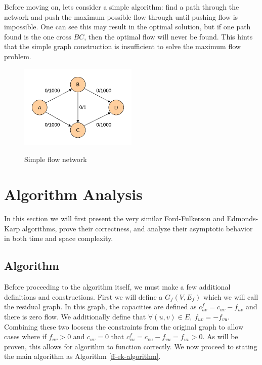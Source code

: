 \documentclass{article}
\begin{document}
Before moving on, lets consider a simple algorithm: find a path through the network and push the maximum possible flow through until pushing flow is impossible. One can see this may result in the optimal solution, but if one path found is the one cross $BC$, then the optimal flow will never be found. This hints that the simple graph construction is insufficient to solve the maximum flow problem.

\begin{figure}[!ht]
	\caption{Simple flow network}
	\centering
	\includegraphics[width=0.5\textwidth]{images/simple-flow.png}
	\label{simple-flow}
\end{figure}

\section{Algorithm Analysis}
In this section we will first present the very similar Ford-Fulkerson and Edmonds-Karp algorithms, prove their correctness, and analyze their asymptotic behavior in both time and space complexity.

\subsection{Algorithm}
Before proceeding to the algorithm itself, we must make a few additional definitions and constructions. First we will define a $G_f(V,E_f)$ which we will call the residual graph. In this graph, the capacities are defined as $c^f_{uv}=c_{uv}-f_{uv}$ and there is zero flow. We additionally define that $\forall (u,v)\in E,\ f_{uv}=-f_{vu}$. Combining these two loosens the constraints from the original graph to allow cases where if $f_{uv}>0$ and $c_{uv}=0$ that $c^f_{vu}=c_{vu}-f_{vu}=f_{uv}>0$. As will be proven, this allows for algorithm to function correctly. We now proceed to stating the main algorithm as Algorithm \ref{ff-ek-algorithm}.
\end{document}
